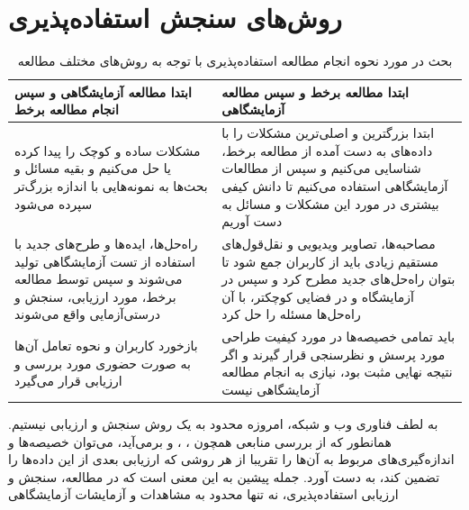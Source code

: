 \section{روش‌های سنجش استفاده‌پذیری}
\begin{table}[H]
	\caption[بحث در مورد نحوه انجام مطالعه استفاده‌پذیری با توجه به روش‌های مختلف مطالعه]{
		بحث در مورد نحوه انجام مطالعه استفاده‌پذیری با توجه به روش‌های مختلف مطالعه
		\cite{albert_measuring_2013}
	}
	\label{tab:studies}
	\centering
	\begin{tabular}{|C{5cm}|C{5cm}|}
		\hline
		‏ابتدا مطالعه آزمایشگاهی و سپس انجام مطالعه برخط
		&
		ابتدا مطالعه برخط و سپس مطالعه آزمایشگاهی	\\ \hline
		مشکلات ساده و کوچک را پیدا کرده یا حل می‌کنیم و بقیه مسائل و بحث‌ها به نمونه‌هایی با اندازه بزرگ‌تر سپرده می‌شود & ابتدا بزرگترین و اصلی‌ترین مشکلات را با داده‌های به دست آمده از مطالعه برخط، شناسایی می‌کنیم و سپس از مطالعات آزمایشگاهی استفاده می‌کنیم تا دانش کیفی بیشتری در مورد این مشکلات و مسائل به دست آوریم  \\ \hline
		راه‌حل‌ها، ایده‌ها و طرح‌های جدید با استفاده از تست آزمایشگاهی تولید می‌شوند و سپس توسط مطالعه برخط، مورد ارزیابی، سنجش و درستی‌آزمایی واقع می‌شوند & مصاحبه‌ها، تصاویر ویدیویی و نقل‌قول‌های مستقیم زیادی باید از کاربران جمع شود تا بتوان راه‌حل‌های جدید مطرح کرد و سپس در آزمایشگاه و در فضایی کوچکتر، با آن راه‌حل‌ها مسئله را حل کرد \\ \hline
		بازخورد کاربران و نحوه تعامل آن‌ها به صورت حضوری مورد بررسی و ارزیابی قرار می‌گیرد &  باید تمامی خصیصه‌ها در مورد کیفیت طراحی مورد پرسش و نظرسنجی قرار گیرند و اگر نتیجه نهایی مثبت بود، نیازی به انجام مطالعه آزمایشگاهی نیست \\ \hline
	\end{tabular}%
\end{table}
به لطف فناوری وب و شبکه، امروزه محدود به یک روش سنجش و ارزیابی نیستیم. همانطور که از بررسی منابعی همچون
\cite{agarwal_assessing_2002}،
\cite{albert_measuring_2013}،
\cite{krug_dont_2018} و
\cite{noauthor_measuringu:_2018}
برمی‌آید، می‌توان خصیصه‌ها و اندازه‌گیری‌های مربوط به آن‌ها را تقریبا از هر روشی که ارزیابی بعدی از این داده‌ها را تضمین کند، به دست آورد. جمله پیشین به این معنی است که در مطالعه، سنجش و ارزیابی استفاده‌پذیری، نه تنها محدود به مشاهدات و آزمایشات آزمایشگاهی
